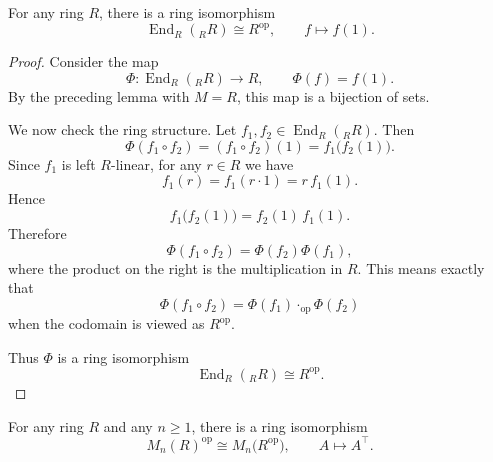 \begin{corollary}
    For any ring $R$, there is a ring isomorphism
    \[
        \operatorname{End}_R({}_R R)\cong R^{\operatorname{op}},
        \qquad
        f\longmapsto f(1).
    \]
\end{corollary}

\begin{proof}
    Consider the map
    \[
        \Phi:\operatorname{End}_R({}_R R)\longrightarrow R,
        \qquad
        \Phi(f)=f(1).
    \]
    By the preceding lemma with $M=R$, this map is a bijection of sets.

    We now check the ring structure. Let $f_1,f_2\in \operatorname{End}_R({}_R R)$. Then
    \[
        \Phi(f_1\circ f_2)
        =(f_1\circ f_2)(1)
        =f_1\bigl(f_2(1)\bigr).
    \]
    Since $f_1$ is left $R$-linear, for any $r\in R$ we have
    \[
        f_1(r)=f_1(r\cdot 1)=r\,f_1(1).
    \]
    Hence
    \[
        f_1\bigl(f_2(1)\bigr)=f_2(1)\,f_1(1).
    \]
    Therefore
    \[
        \Phi(f_1\circ f_2)=\Phi(f_2)\Phi(f_1),
    \]
    where the product on the right is the multiplication in $R$. This means exactly that
    \[
        \Phi(f_1\circ f_2)=\Phi(f_1)\cdot_{\operatorname{op}}\Phi(f_2)
    \]
    when the codomain is viewed as $R^{\operatorname{op}}$.

    Thus $\Phi$ is a ring isomorphism
    \[
        \operatorname{End}_R({}_R R)\cong R^{\operatorname{op}}.
    \]
\end{proof}

\begin{lemma}
    For any ring $R$ and any $n\ge 1$, there is a ring isomorphism
    \[
        M_n(R)^{\operatorname{op}}\cong M_n\bigl(R^{\operatorname{op}}\bigr),
        \qquad
        A\longmapsto A^{\top}.
    \]
\end{lemma}

